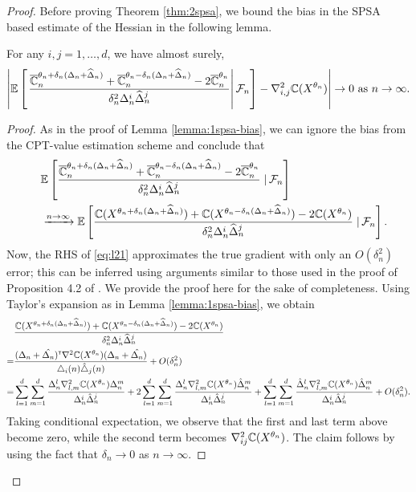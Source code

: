 \begin{proof}
Before proving Theorem \ref{thm:2spsa}, we bound the bias in the SPSA based estimate of the Hessian in the following lemma.
\begin{lemma}
\label{lemma:2spsa-bias}
For any $i, j= 1,\ldots,d$, we have almost surely,  
\begin{align}
    \left| \mathbb{E}\left[\left.\dfrac{\overline {\mathbb{C}}_n^{\theta_n+\delta_n(\Delta_n+\widehat\Delta_n)} + \overline {\mathbb{C}}_n^{\theta_n-\delta_n(\Delta_n+\widehat\Delta_n)} - 2 \overline {\mathbb{C}}_n^{\theta_n}}{\delta_n^2 \Delta_n^{i}\widehat\Delta_n^j}\right| \mathcal{F}_n \right] - \nabla^2_{i,j} \mathbb{C}(X^{\theta_n}) \right| \rightarrow 0 \text{ as } n\rightarrow\infty.
\end{align} 
\end{lemma}
\begin{proof}
As in the proof of Lemma \ref{lemma:1spsa-bias}, we can ignore the bias from the CPT-value estimation scheme and conclude that
\begin{align}
    \quad&\mathbb{E}\left[\dfrac{\overline {\mathbb{C}}_n^{\theta_n+\delta_n(\Delta_n+\widehat\Delta_n)} + \overline {\mathbb{C}}_n^{\theta_n-\delta_n(\Delta_n+\widehat\Delta_n)} - 2\overline {\mathbb{C}}_n^{\theta_n}}{\delta_n^2 \Delta_n^i\widehat\Delta_n^j} \left.\right| \mathcal{F}_n\right] \nonumber\\
     &\xrightarrow{n\rightarrow\infty}  \mathbb{E}\left[\dfrac{\mathbb{C}(X^{\theta_n+\delta_n(\Delta_n+\widehat\Delta_n)}) + \mathbb{C}(X^{\theta_n-\delta_n(\Delta_n+\widehat\Delta_n)}) - 2\mathbb{C}(X^{\theta_n})}{\delta_n^2 \Delta_n^i\widehat\Delta_n^j} \left.\right| \mathcal{F}_n\right].  \label{eq:l21}
\end{align}
Now, the RHS of \eqref{eq:l21} approximates the true gradient with only an $O(\delta_n^2)$ error; this can be inferred using arguments similar to those used in the proof of Proposition 4.2 of \cite{bhatnagar2015simultaneous}. We provide the proof here for the sake of completeness.
Using Taylor's expansion as in Lemma \ref{lemma:1spsa-bias}, we obtain
\begin{align*}
&\dfrac{\mathbb{C}(X^{\theta_n+\delta_n(\Delta_n+\widehat\Delta_n)}) + \mathbb{C}(X^{\theta_n-\delta_n(\Delta_n+\widehat\Delta_n)}) - 2\mathbb{C}(X^{\theta_n})}{\delta_n^2 \Delta_n^i\widehat\Delta_n^j}\\
=&  \frac{(\Delta_n+\hat{\Delta_n})^\mathsf{\scriptscriptstyle T} \nabla^2 \mathbb{C}(X^{\theta_n})(\Delta_n
+\hat{\Delta_n})}{\triangle_i(n)\hat{\triangle}_j(n)}
+ O(\delta_n^2) \\
=& \sum_{l=1}^{d}\sum_{m=1}^{d} \frac{\Delta_n^l\nabla^2_{l,m}\mathbb{C}(X^{\theta_n})\Delta_n^m}{\Delta_n^i
\hat{\Delta}_n^j} + 2\sum_{l=1}^{d}\sum_{m=1}^{d} \frac{\Delta_n^l\nabla^2_{l,m}
\mathbb{C}(X^{\theta_n})\hat{\Delta}_n^m}{\Delta_n^i
\hat{\Delta}_n^j}+ \sum_{l=1}^{d}\sum_{m=1}^{d} \frac{\hat{\Delta}_n^l\nabla^2_{l,m}\mathbb{C}(X^{\theta_n})\hat{\Delta}_n^m}{\Delta_n^i
\hat{\Delta}_n^j} + O(\delta_n^2).
\end{align*}
Taking conditional expectation, we observe that the first and last term above become zero, while the second term becomes $\nabla^2_{ij}
\mathbb{C}(X^{\theta_n})$. The claim follows by using the fact that $\delta_n \rightarrow 0$ as $n\rightarrow \infty$.
\end{proof}


\end{proof}
